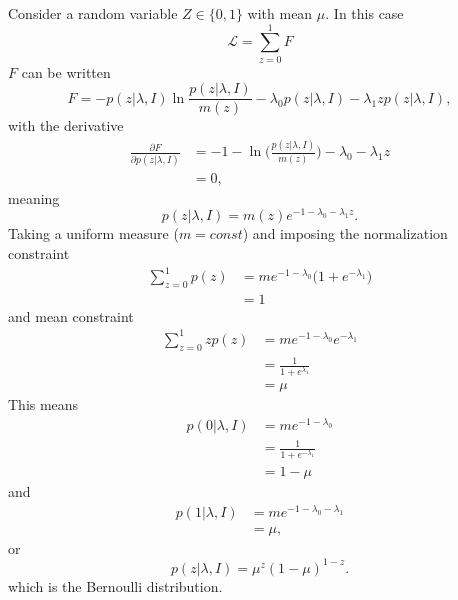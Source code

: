 \begin{example}
	Consider a random variable $Z\in\{0,1\}$ with mean $\mu$. In this case
	\begin{equation}
		\mathcal{L} = \sum_{z=0}^1 F
	\end{equation}
	 $F$ can be written
	\begin{equation}
		F = - p(z|\lambda,I)\ln\frac{p(z|\lambda,I)}{m(z)} - \lambda_0 p(z|\lambda,I) - \lambda_1 zp(z|\lambda,I),
	\end{equation}
	with the derivative
	\begin{equation}
		\begin{split}
			\frac{\partial F}{\partial p(z|\lambda,I)} &= -1 - \ln\bigg(\frac{p(z|\lambda,I)}{m(z)}\bigg) - \lambda_0 - \lambda_1 z\\
			& = 0,
		\end{split}
	\end{equation}
	meaning
	\begin{equation}
		p(z|\lambda,I) = m(z) e^{-1-\lambda_0 - \lambda_1 z}.
	\end{equation}
	Taking a uniform measure ($m= const$) and imposing the normalization constraint
	\begin{equation}
		\begin{split}
			\sum_{z=0}^1 p(z) &=m e^{-1-\lambda_0}\bigg(1+ e^{- \lambda_1}\bigg)\\
			&=1
		\end{split}
	\end{equation}
	and mean constraint
	\begin{equation}
		\begin{split}
			\sum_{z=0}^1 zp(z) &=m e^{-1-\lambda_0}e^{- \lambda_1}\\
			& = \frac{1}{1+ e^{\lambda_1}}\\
			&=\mu
		\end{split}
	\end{equation}
	This means
	\begin{equation}
		\begin{split}
			p(0|\lambda,I) &= m e^{-1-\lambda_0}\\
			&= \frac{1}{1+ e^{- \lambda_1}}\\
			& = 1-\mu
		\end{split}
	\end{equation}	
	and
	\begin{equation}
		\begin{split}
			p(1|\lambda,I) &= m e^{-1-\lambda_0-\lambda_1}\\
			&=\mu,
		\end{split}
	\end{equation}
	or 
	\begin{equation}
		p(z|\lambda,I) = \mu^z (1-\mu)^{1-z}.
	\end{equation}
	which is the Bernoulli distribution.
\end{example}

